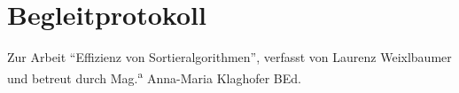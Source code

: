 \documentclass[a4paper]{article}
\begin{document}
    \section*{Begleitprotokoll}
    
    Zur Arbeit \enquote{Effizienz von Sortieralgorithmen}, verfasst von Laurenz Weixlbaumer und betreut durch Mag.\textsuperscript{a} Anna-Maria Klaghofer BEd.
\end{document}
